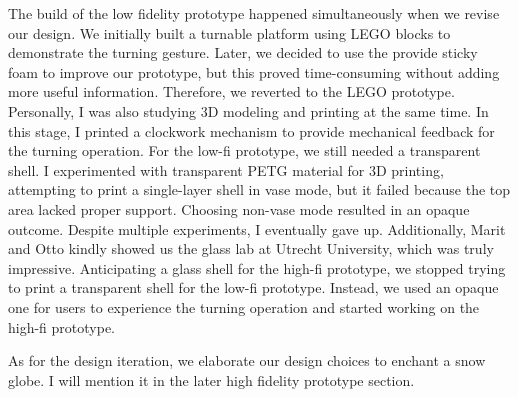  The build of the low fidelity prototype happened simultaneously when we revise our design. We initially built a turnable platform using LEGO blocks to demonstrate the turning gesture. Later, we decided to use the provide sticky foam to improve our prototype, but this proved time-consuming without adding more useful information. Therefore, we reverted to the LEGO prototype. Personally, I was also studying 3D modeling and printing at the same time. In this stage, I printed a clockwork mechanism to provide mechanical feedback for the turning operation. For the low-fi prototype, we still needed a transparent shell. I experimented with transparent PETG material for 3D printing, attempting to print a single-layer shell in vase mode, but it failed because the top area lacked proper support. Choosing non-vase mode resulted in an opaque outcome. Despite multiple experiments, I eventually gave up. Additionally, Marit and Otto kindly showed us the glass lab at Utrecht University, which was truly impressive. Anticipating a glass shell for the high-fi prototype, we stopped trying to print a transparent shell for the low-fi prototype. Instead, we used an opaque one for users to experience the turning operation and started working on the high-fi prototype.

As for the design iteration, we elaborate our design choices to enchant a snow globe. I will mention it in the later high fidelity prototype section.